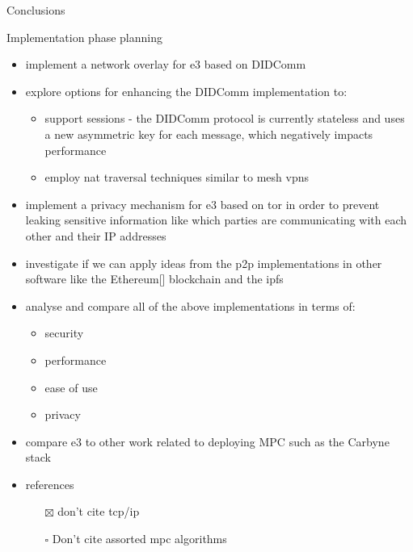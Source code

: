 \begin{frame}[fragile]{Conclusions}
\begin{block}{Implementation phase planning}
\begin{itemize}
  \begin{itemize}
  \tightlist
  \item
    using a \gls{ca} that is managed jointly using MPC
  \item
    using a form of \gls{ssi} such as \glspl{did}
  \end{itemize}
\item
  implement a network overlay for \gls{e3} based on DIDComm
\item
  explore options for enhancing the DIDComm implementation to:

  \begin{itemize}
  \tightlist
  \item
    support sessions - the DIDComm protocol is currently stateless and
    uses a new asymmetric key for each message, which negatively impacts
    performance
  \item
    employ \gls{nat} traversal techniques similar to mesh \glspl{vpn}
  \end{itemize}
\item
  implement a privacy mechanism for \gls{e3} based on \gls{tor} in order
  to prevent leaking sensitive information like which parties are
  communicating with each other and their IP addresses
\item
  investigate if we can apply ideas from the \gls{p2p} implementations
  in other software like the
  Ethereum{[}\textcite{ethereumDocs}{]}\autocite{ethereumYellowPaper}
  blockchain and the \gls{ipfs} \autocite{ipfsDocs}
\item
  analyse and compare all of the above implementations in terms of:

  \begin{itemize}
  \tightlist
  \item
    security
  \item
    performance
  \item
    ease of use
  \item
    privacy
  \end{itemize}
\item
  compare \gls{e3} to other work related to deploying MPC such as the
  Carbyne stack\autocite{robertboschgmbhCarbyneStack2022}
\item
  references

  \begin{itemize}
  \tightlist
  \item[$\boxtimes$]
    don't cite tcp/ip
  \item[$\square$]
    Don't cite assorted mpc algorithms


\end{itemize}
\end{itemize}
\end{block}
\end{frame}
